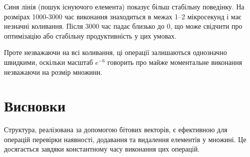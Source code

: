 \documentclass[a4paper,12pt]{article}
\begin{document}
Синя лінія (пошук існуючого елемента) показує більш стабільну поведінку. На розмірах 1000-3000 час виконання знаходиться в межах 1–2 мікросекунд і має незначні коливання. Після 3000 час падає близько до 0, що може свідчити про оптимізацію або стабільну продуктивність у цих умовах.

Проте незважаючи на всі коливання, ці операції залишаються однозначно швидкими, оскільки масштаб \( e^{-6} \) говорить про майже моментальне виконання незважаючи на розмір множини.

\section{Висновки}
Структура, реалізована за допомогою бітових векторів, є ефективною для операцій перевірки наявності, додавання та видалення елементів у множині. Це досягається завдяки константному часу виконання цих операцій.
\end{document}
